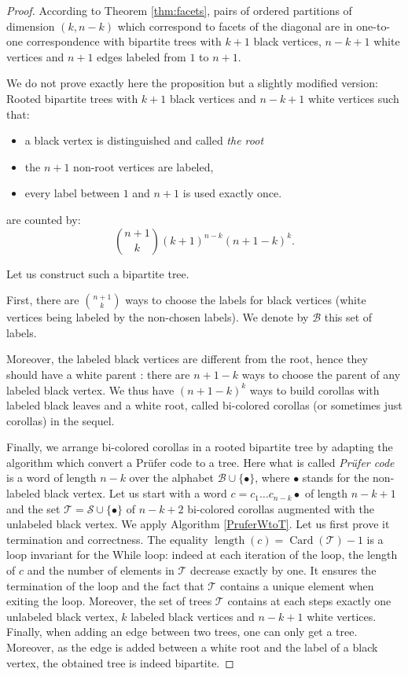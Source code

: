 \begin{proof}
According to Theorem \cref{thm:facets}, pairs of ordered partitions of dimension $(k,n-k)$ which correspond to facets of the diagonal are in one-to-one correspondence with bipartite trees with $k+1$ black vertices, $n-k+1$ white vertices and $n+1$ edges labeled from $1$ to $n+1$.

We do not prove exactly here the proposition but a slightly modified version: 
Rooted bipartite trees with $k+1$ black vertices and $n-k+1$ white vertices such that:
\begin{itemize}
\item a black vertex is distinguished and called \emph{the root}
\item the $n+1$ non-root vertices are labeled,
\item every label between $1$ and $n+1$ is used exactly once.
\end{itemize}
are counted by:
\begin{equation}
\binom{n+1}{k}(k+1)^{n-k}(n+1-k)^{k}.
\end{equation}

Let us construct such a bipartite tree. 

First, there are $\binom{n+1}{k}$ ways to  choose the labels for black vertices (white vertices being labeled by the non-chosen labels). 
We denote by $\mathcal{B}$ this set of labels.

Moreover, the labeled black vertices are different from the root, hence they should have a white parent : there are $n+1-k$ ways to choose the parent of any labeled black vertex. 
We thus have  $(n+1-k)^{k}$ ways to build corollas with labeled black leaves and a white root, called bi-colored corollas (or sometimes just corollas) in the sequel.

Finally, we arrange bi-colored corollas in a rooted bipartite tree by adapting the algorithm which convert a Pr\"ufer code to a tree. 
Here what is called \emph{Pr\"ufer code} is a word of length $n-k$ over the alphabet $\mathcal{B} \cup \{\bullet\}$, where $\bullet$ stands for the non-labeled black vertex. 
Let us start with a word $c=c_1 \ldots c_{n-k} \bullet$ of length $n-k+1$ and the set $\mathcal{T}=\mathcal{S} \cup \{\bullet\}$ of $n-k+2$ bi-colored corollas augmented with the unlabeled black vertex. 
We apply Algorithm \ref{PruferWtoT}. Let us first prove it termination and correctness. The equality 
$\operatorname{length}(c)=\operatorname{Card}(\mathcal{T})-1$ is a loop invariant for the While loop: indeed at each iteration of the loop, the length of $c$ and the number of elements in $\mathcal{T}$ decrease exactly by one. It ensures the termination of the loop and the fact that $\mathcal{T}$ contains a unique element when exiting the loop. Moreover, the set of trees $\mathcal{T}$ contains at each steps exactly one unlabeled black vertex, $k$ labeled black vertices and $n-k+1$ white vertices. Finally, when adding an edge between two trees, one can only get a tree. Moreover, as the edge is added between a white root and the label of a black vertex, the obtained tree is indeed bipartite.


\end{proof}
